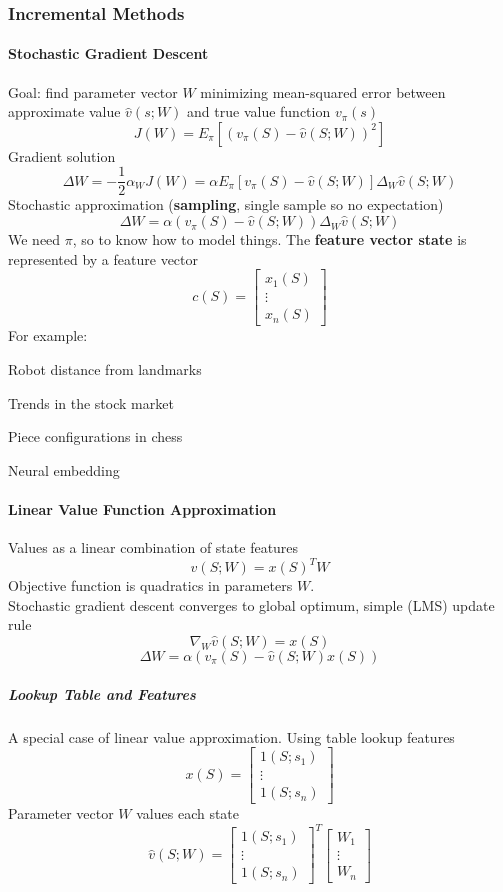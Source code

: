 \documentclass[10pt]{report}
\begin{document}
\subsubsection{Incremental Methods}
\paragraph{Stochastic Gradient Descent} Goal: find parameter vector $W$ minimizing mean-squared error between approximate value $\hat{v}(s;W)$ and true value function $v_\pi(s)$
$$J(W) = E_\pi[(v_\pi(S)-\hat{v}(S;W))^2]$$
Gradient solution
$$\Delta W= -\frac{1}{2}\alpha_{W}J(W) = \alpha E_\pi[v_\pi(S) - \hat{v}(S;W)]\Delta_W\hat{v}(S;W)$$
Stochastic approximation (\textbf{sampling}, single sample so no expectation)
$$\Delta W=\alpha(v_\pi(S)-\hat{v}(S;W))\Delta_W\hat{v}(S;W)$$
We need $\pi$, so to know how to model things. The \textbf{feature vector state} is represented by a feature vector
$$c(S)=\left[\begin{array}{c}
x_1(S)\\\vdots\\x_n(S)
\end{array}\right]$$
For example:
\begin{list}{}{}
	\item Robot distance from landmarks
	\item Trends in the stock market
	\item Piece configurations in chess
	\item Neural embedding
\end{list}
\paragraph{Linear Value Function Approximation} Values as a linear combination of state features $$\hat{v}(S;W) = x(S)^TW$$
Objective function is quadratics in parameters $W$.\\
Stochastic gradient descent converges to global optimum, simple (LMS) update rule
$$\nabla_W\hat{v}(S;W)=x(S)$$
$$\Delta W=\alpha(v_\pi(S)-\hat{v}(S;W)x(S))$$
\subparagraph{Lookup Table and Features} A special case of linear value approximation. Using table lookup features
$$x(S)=\left[\begin{array}{c}
1(S;s_1)\\\vdots\\1(S;s_n)
\end{array}\right]$$
Parameter vector $W$ values each state
$$\hat{v}(S;W)=\left[\begin{array}{c}
1(S;s_1)\\\vdots\\1(S;s_n)
\end{array}\right]^T\left[\begin{array}{c}
W_1\\\vdots\\W_n
\end{array}\right]$$
\end{document}
